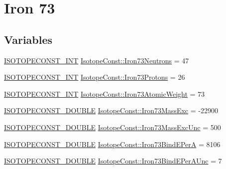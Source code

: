 \hypertarget{group___isotope_const-_iron-_fe73}{}\section{Iron 73}
\label{group___isotope_const-_iron-_fe73}
\subsection*{Variables}
\begin{DoxyCompactItemize}
\item 
\mbox{\hyperlink{group___isotope_const-_macros_ga5f18360b3e99483a35c32d789e62621c}{I\+S\+O\+T\+O\+P\+E\+C\+O\+N\+S\+T\+\_\+\+I\+NT}} \mbox{\hyperlink{group___isotope_const-_iron-_fe73_ga76523f5e93a6e337ef1bfca16d751e33}{Isotope\+Const\+::\+Iron73\+Neutrons}} = 47
\item 
\mbox{\hyperlink{group___isotope_const-_macros_ga5f18360b3e99483a35c32d789e62621c}{I\+S\+O\+T\+O\+P\+E\+C\+O\+N\+S\+T\+\_\+\+I\+NT}} \mbox{\hyperlink{group___isotope_const-_iron-_fe73_gacd3f0efa4c432b300b2b2544973984c7}{Isotope\+Const\+::\+Iron73\+Protons}} = 26
\item 
\mbox{\hyperlink{group___isotope_const-_macros_ga5f18360b3e99483a35c32d789e62621c}{I\+S\+O\+T\+O\+P\+E\+C\+O\+N\+S\+T\+\_\+\+I\+NT}} \mbox{\hyperlink{group___isotope_const-_iron-_fe73_ga7e462052a0585ef658707a9bd8ab5ae2}{Isotope\+Const\+::\+Iron73\+Atomic\+Weight}} = 73
\item 
\mbox{\hyperlink{group___isotope_const-_macros_ga8f45a7272ce02c0b4c65c44636ed719a}{I\+S\+O\+T\+O\+P\+E\+C\+O\+N\+S\+T\+\_\+\+D\+O\+U\+B\+LE}} \mbox{\hyperlink{group___isotope_const-_iron-_fe73_ga848e64a90a0d5ce74b23032c29a819b0}{Isotope\+Const\+::\+Iron73\+Mass\+Exc}} = -\/22900
\item 
\mbox{\hyperlink{group___isotope_const-_macros_ga8f45a7272ce02c0b4c65c44636ed719a}{I\+S\+O\+T\+O\+P\+E\+C\+O\+N\+S\+T\+\_\+\+D\+O\+U\+B\+LE}} \mbox{\hyperlink{group___isotope_const-_iron-_fe73_ga1aa5cc3679f67fddbab873278b4eb92e}{Isotope\+Const\+::\+Iron73\+Mass\+Exc\+Unc}} = 500
\item 
\mbox{\hyperlink{group___isotope_const-_macros_ga8f45a7272ce02c0b4c65c44636ed719a}{I\+S\+O\+T\+O\+P\+E\+C\+O\+N\+S\+T\+\_\+\+D\+O\+U\+B\+LE}} \mbox{\hyperlink{group___isotope_const-_iron-_fe73_ga1a0b5ba4ecd266c050196740b7f2c9e9}{Isotope\+Const\+::\+Iron73\+Bind\+E\+PerA}} = 8106
\item 
\mbox{\hyperlink{group___isotope_const-_macros_ga8f45a7272ce02c0b4c65c44636ed719a}{I\+S\+O\+T\+O\+P\+E\+C\+O\+N\+S\+T\+\_\+\+D\+O\+U\+B\+LE}} \mbox{\hyperlink{group___isotope_const-_iron-_fe73_gad257b498c4d95e638101efe3693dcb41}{Isotope\+Const\+::\+Iron73\+Bind\+E\+Per\+A\+Unc}} = 7

\end{DoxyCompactItemize}

